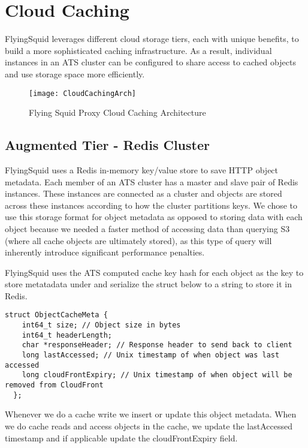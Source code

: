 \section{Cloud Caching}

FlyingSquid leverages different cloud storage tiers, each with unique benefits, to build a more sophisticated caching infrastructure. As a result, individual instances in an ATS cluster can be configured to share access to cached objects and use storage space more efficiently.

\begin{figure}[H] \centering
\texttt{[image: CloudCachingArch]}
\caption{Flying Squid Proxy Cloud Caching Architecture}
\end{figure}

\subsection{Augmented Tier - Redis Cluster}
FlyingSquid uses a Redis in-memory key/value store to save HTTP object metadata. Each member of an ATS cluster has a master and slave pair of Redis instances. These instances are connected as a cluster and objects are stored across these instances according to how the cluster partitions keys. We chose to use this storage format for object metadata as opposed to storing data with each object because we needed a faster method of accessing data than querying S3 (where all cache objects are ultimately stored), as this type of query will inherently introduce significant performance penalties.

\newpage

\noindent
FlyingSquid uses the ATS computed cache key hash for each object as the key to store metatadata under and serialize the struct below to a string to store it in Redis.\\

\begin{lstlisting}
struct ObjectCacheMeta {
    int64_t size; // Object size in bytes
    int64_t headerLength;
    char *responseHeader; // Response header to send back to client
    long lastAccessed; // Unix timestamp of when object was last accessed
    long cloudFrontExpiry; // Unix timestamp of when object will be removed from CloudFront
  };
\end{lstlisting}

\noindent
Whenever we do a cache write we insert or update this object metadata. When we do cache reads and access objects in the cache, we update the lastAccessed timestamp and if applicable update the cloudFrontExpiry field.

